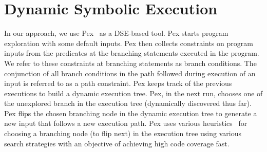 \section{Dynamic Symbolic Execution}
In our approach, we use Pex~\cite{Pex} as a DSE-based tool. Pex starts program exploration with some default inputs. Pex then collects constraints on program inputs from the predicates at the branching statements executed in the program. We refer to these constraints at branching statements as branch conditions. 
The conjunction of all branch conditions in the path followed during execution of an input is referred to as a path constraint. Pex keeps track of the previous executions to build a dynamic execution tree. Pex, in the next run, chooses one of the unexplored branch in the execution tree (dynamically discovered thus far). Pex flips the chosen branching node in the dynamic execution tree to generate a new input that follows a new execution path. Pex uses various heuristics~\cite{fitnex} for choosing a branching node (to flip next) in the execution tree using various search strategies with an objective of achieving high code coverage fast.
 
